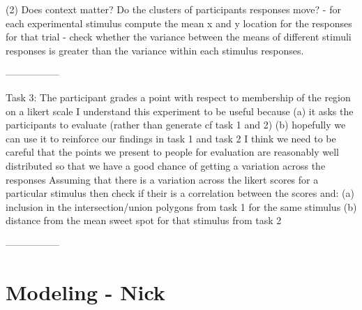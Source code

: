 \documentclass[11pt,letterpaper]{article}
\begin{document}
(2) Does context matter?
Do the clusters of participants responses move?
- for each experimental stimulus compute the mean x and y location for the responses for that trial
- check whether the variance between the means of different stimuli responses is greater than the variance within each stimulus responses.

-----------------


Task 3: The participant grades a point with respect to membership of the region on a likert scale
I understand this experiment to be useful because (a) it asks the participants to evaluate (rather than generate cf task 1 and 2) (b) hopefully we can use it to reinforce our findings in task 1 and task 2
I think we need to be careful that the points we present to people for evaluation are reasonably well distributed so that we have a good chance of getting a variation across the responses
Assuming that there is a variation across the likert scores for a particular stimulus then check if their is a correlation between the scores and:
(a) inclusion in the intersection/union polygons from task 1 for the same stimulus
(b) distance from the mean sweet spot for that stimulus from task 2

-----------------
 




\section{Modeling - Nick}
\end{document}

